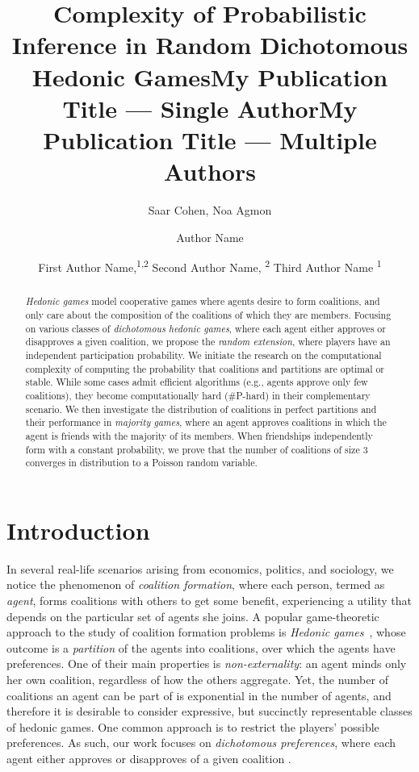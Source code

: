 \documentclass[letterpaper]{article}
\title{Complexity of Probabilistic Inference in Random Dichotomous Hedonic Games}
\author{
    Saar Cohen,
    Noa Agmon
}
\title{My Publication Title --- Single Author}
\author {
    Author Name
}
\title{My Publication Title --- Multiple Authors}
\author {
    First Author Name,\textsuperscript{\rm 1,\rm 2}
    Second Author Name, \textsuperscript{\rm 2}
    Third Author Name \textsuperscript{\rm 1}
}
\begin{document}
\maketitle

\begin{abstract}
\textit{Hedonic games} model cooperative games where agents desire to form coalitions, and only care about the composition of the coalitions of which they are members. %
Focusing on various classes of \textit{dichotomous hedonic games}, where each agent either approves or disapproves a given coalition, we propose the \textit{random extension}, where players have an independent participation probability. We initiate the research on the computational complexity of computing the probability that coalitions and partitions are optimal or stable. While some cases admit efficient algorithms (e.g., agents approve only few coalitions), they become computationally hard (\#P-hard) in their complementary scenario. We then investigate the distribution of coalitions in perfect partitions and their performance in \textit{majority games}, where an agent approves coalitions in which the agent is friends with the majority of its members. When friendships independently form with a constant probability, we prove that the number of coalitions of size $3$ converges in distribution to a Poisson random variable.
\end{abstract}

\section{Introduction}
\label{sec:Introduction}
In several real-life scenarios arising from economics, politics, and sociology, we notice the phenomenon of \textit{coalition formation}, where each person, termed as \textit{agent}, forms coalitions with others to get some benefit, experiencing a utility that depends on the particular set of agents she joins. A popular game-theoretic approach to the study of coalition formation problems is \textit{Hedonic games}~\cite{dreze1980hedonic}, whose outcome is a \textit{partition} of the agents into coalitions, over which the agents have preferences. One of their main properties is \textit{non-externality}: an agent minds only her own coalition, regardless of how the others aggregate. Yet, the number of coalitions an agent can be part of is exponential in the number of agents, and therefore it is desirable to consider expressive, but succinctly representable classes of hedonic games. One common approach is to restrict the players' possible preferences. As such, our work focuses on \textit{dichotomous preferences}, where each agent either approves or disapproves of a given coalition \cite{aziz2016boolean}. %
\end{document}
